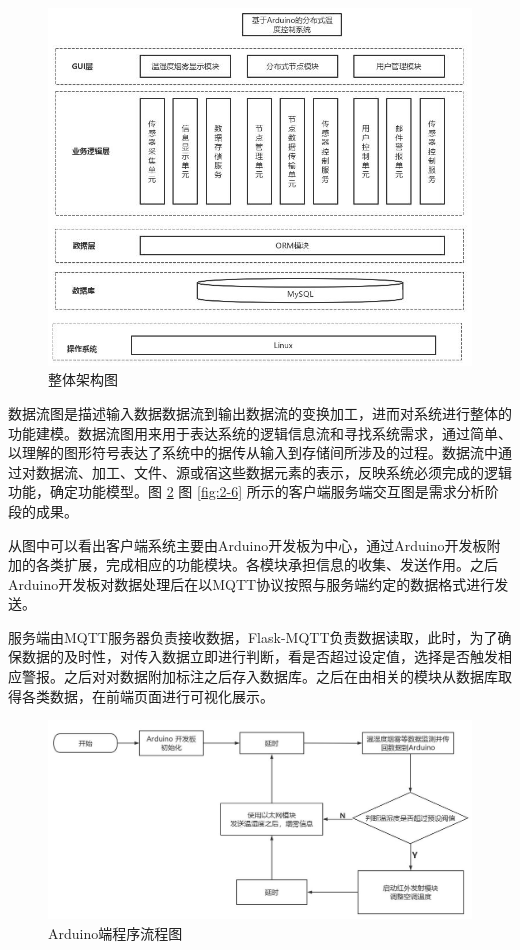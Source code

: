 \begin{figure}[htbp]
	\centering
	\includegraphics[width=1\linewidth]{figure/2-4}
	\caption{整体架构图}
	\label{fig:2-4}
\end{figure}

数据流图是描述输入数据数据流到输出数据流的变换加工，进而对系统进行整体的功能建模。数据流图用来用于表达系统的逻辑信息流和寻找系统需求，通过简单、以理解的图形符号表达了系统中的据传从输入到存储间所涉及的过程。数据流中通过对数据流、加工、文件、源或宿这些数据元素的表示，反映系统必须完成的逻辑功能，确定功能模型。图 \ref{fig:2-5} 图 \ref{fig:2-6} 所示的客户端服务端交互图是需求分析阶段的成果。

从图中可以看出客户端系统主要由Arduino开发板为中心，通过Arduino开发板附加的各类扩展，完成相应的功能模块。各模块承担信息的收集、发送作用。之后Arduino开发板对数据处理后在以MQTT协议按照与服务端约定的数据格式进行发送。

服务端由MQTT服务器负责接收数据，Flask-MQTT负责数据读取，此时，为了确保数据的及时性，对传入数据立即进行判断，看是否超过设定值，选择是否触发相应警报。之后对对数据附加标注之后存入数据库。之后在由相关的模块从数据库取得各类数据，在前端页面进行可视化展示。

\begin{figure}[htbp]
	\centering
	\includegraphics[width=0.85\linewidth]{figure/2-5}
	\caption{Arduino端程序流程图}
	\label{fig:2-5}
\end{figure}

